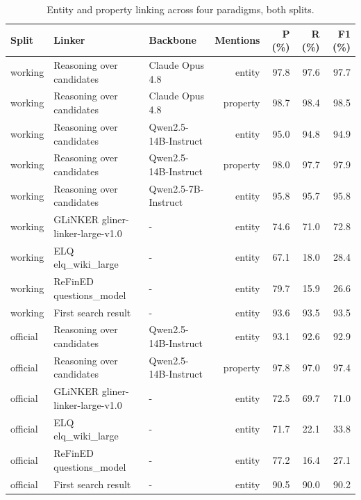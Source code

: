 \begin{table}[htbp]
  \centering
  \caption{Entity and property linking across four paradigms, both splits.}
  \label{tab:linkers}
  \small
  \setlength{\tabcolsep}{3pt}
  \begin{tabular}{lllrrrr}
    \toprule
    Split & Linker & Backbone & Mentions & P (\%) & R (\%) & F1 (\%) \\
    \midrule
    working & Reasoning over candidates & Claude Opus 4.8 & entity & 97.8 & 97.6 & 97.7 \\
    working & Reasoning over candidates & Claude Opus 4.8 & property & 98.7 & 98.4 & 98.5 \\
    working & Reasoning over candidates & Qwen2.5-14B-Instruct & entity & 95.0 & 94.8 & 94.9 \\
    working & Reasoning over candidates & Qwen2.5-14B-Instruct & property & 98.0 & 97.7 & 97.9 \\
    working & Reasoning over candidates & Qwen2.5-7B-Instruct & entity & 95.8 & 95.7 & 95.8 \\
    working & GLiNKER gliner-linker-large-v1.0 & - & entity & 74.6 & 71.0 & 72.8 \\
    working & ELQ elq\_wiki\_large & - & entity & 67.1 & 18.0 & 28.4 \\
    working & ReFinED questions\_model & - & entity & 79.7 & 15.9 & 26.6 \\
    working & First search result & - & entity & 93.6 & 93.5 & 93.5 \\
    official & Reasoning over candidates & Qwen2.5-14B-Instruct & entity & 93.1 & 92.6 & 92.9 \\
    official & Reasoning over candidates & Qwen2.5-14B-Instruct & property & 97.8 & 97.0 & 97.4 \\
    official & GLiNKER gliner-linker-large-v1.0 & - & entity & 72.5 & 69.7 & 71.0 \\
    official & ELQ elq\_wiki\_large & - & entity & 71.7 & 22.1 & 33.8 \\
    official & ReFinED questions\_model & - & entity & 77.2 & 16.4 & 27.1 \\
    official & First search result & - & entity & 90.5 & 90.0 & 90.2 \\
    \bottomrule
  \end{tabular}
\end{table}

